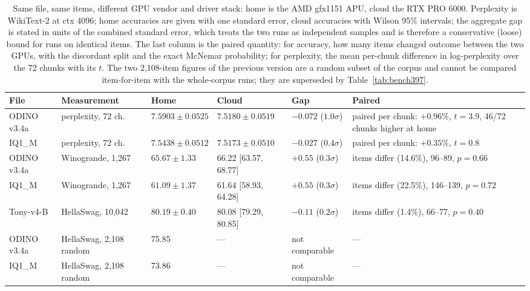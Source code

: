 \documentclass[10pt]{article} %
\begin{document}
\begin{table}[t]
\centering
\small
\setlength{\tabcolsep}{3pt}
\footnotesize
\begin{tabular}{@{}l l l l l >{\raggedright\arraybackslash}p{3.7cm}@{}}
\toprule
File & Measurement & Home & Cloud & Gap & Paired \\
\midrule
ODINO v3.4a & perplexity, 72 ch. & $7.5903 \pm 0.0525$ & $7.5180 \pm 0.0519$ & $-0.072$ ($1.0\sigma$) & paired per chunk: $+0.96\%$, $t = 3.9$, 46/72 chunks higher at home \\
IQ1\_M & perplexity, 72 ch. & $7.5438 \pm 0.0512$ & $7.5173 \pm 0.0510$ & $-0.027$ ($0.4\sigma$) & paired per chunk: $+0.35\%$, $t = 0.8$ \\
ODINO v3.4a & Winogrande, 1,267 & $65.67 \pm 1.33$ & 66.22 [63.57, 68.77] & $+0.55$ ($0.3\sigma$) & 185 items differ (14.6\%), 96--89, $p = 0.66$ \\
IQ1\_M & Winogrande, 1,267 & $61.09 \pm 1.37$ & 61.64 [58.93, 64.28] & $+0.55$ ($0.3\sigma$) & 285 items differ (22.5\%), 146--139, $p = 0.72$ \\
Tony-v4-B & HellaSwag, 10,042 & $80.19 \pm 0.40$ & 80.08 [79.29, 80.85] & $-0.11$ ($0.2\sigma$) & 143 items differ (1.4\%), 66--77, $p = 0.40$ \\
ODINO v3.4a & HellaSwag, 2,108 random & 75.85 & --- & not comparable & --- \\
IQ1\_M & HellaSwag, 2,108 random & 73.86 & --- & not comparable & --- \\
\bottomrule
\end{tabular}
\caption{Same file, same items, different GPU vendor and driver stack: home
is the AMD gfx1151 APU, cloud the
RTX PRO 6000. Perplexity is WikiText-2 at ctx 4096; home accuracies are given with one
standard error, cloud accuracies with Wilson 95\% intervals; the aggregate gap
is stated in units of the combined standard error, which treats the two runs as
independent samples and is therefore a conservative (loose) bound for runs on
identical items. The last column is the paired quantity: for accuracy, how many
items changed outcome between the two GPUs, with the discordant split and the
exact McNemar probability; for perplexity, the mean per-chunk difference in
log-perplexity over the 72 chunks with its $t$. The two
2,108-item figures of the previous version are a random subset of the corpus
and cannot be compared item-for-item with the whole-corpus runs; they are
superseded by Table~\ref{tab:bench397}.}
\label{tab:crosscheck}
\end{table}
\end{document}
